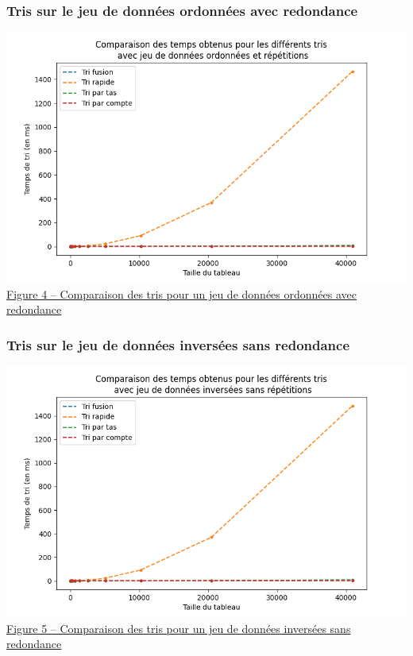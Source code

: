 \documentclass[11pt,a4paper]{article}
\begin{document}
\subsubsection{Tris sur le jeu de données ordonnées avec redondance}
\includegraphics[scale = 0.5]{Images/Courbes img/trié avec rep/ordonnées avec répétitions.png}\\
\underline {Figure 4 – Comparaison des tris pour un jeu de données ordonnées avec redondance}

\subsubsection{Tris sur le jeu de données inversées sans redondance}
\includegraphics[scale = 0.5]{Images/Courbes img/inversé sans rep/inversées sans répétitions.png}\\
\underline {Figure 5 – Comparaison des tris pour un jeu de données inversées sans redondance}
\end{document}

